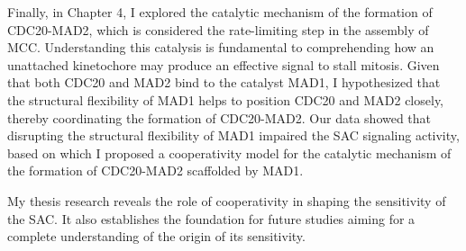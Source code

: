 Finally, in Chapter 4, I explored the catalytic mechanism of the formation of CDC20-MAD2, which is considered the rate-limiting step in the assembly of MCC. Understanding this catalysis is fundamental to comprehending how an unattached kinetochore may produce an effective signal to stall mitosis. Given that both CDC20 and MAD2 bind to the catalyst MAD1, I hypothesized that the structural flexibility of MAD1 helps to position CDC20 and MAD2 closely, thereby coordinating the formation of CDC20-MAD2. Our data showed that disrupting the structural flexibility of MAD1 impaired the SAC signaling activity, based on which I proposed a cooperativity model for the catalytic mechanism of the formation of CDC20-MAD2 scaffolded by MAD1.

My thesis research reveals the role of cooperativity in shaping the sensitivity of the SAC. It also establishes the foundation for future studies aiming for a complete understanding of the origin of its sensitivity.